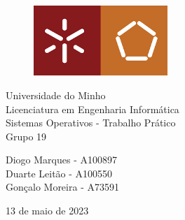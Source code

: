 \begin{titlepage}
    \centering
    \fontsize{25}{0}\selectfont
    
    \begin{figure}
        \centering
        \includegraphics[width=0.45\textwidth]{images/uminho.png}
        \caption*{}
        \label{fig:my_label}
    \end{figure}

    Universidade do Minho \\
    \Large Licenciatura em Engenharia Informática \\
    
    \vspace*{4.3cm}
    \Large Sistemas Operativos - Trabalho Prático \\ 
    \large Grupo 19

    \vspace*{4.3cm}
    
    \large Diogo Marques - A100897 \\
    \large Duarte Leitão - A100550 \\
    \large Gonçalo Moreira - A73591 \\

    \vspace*{1cm}

    \large 13 de maio de 2023
\end{titlepage}
